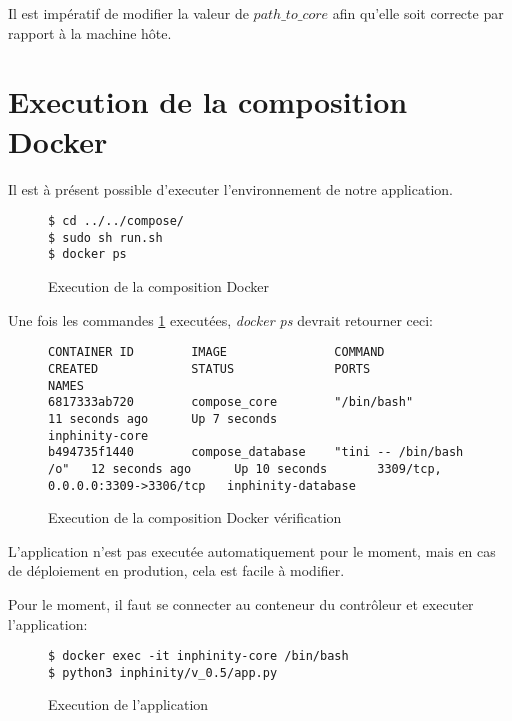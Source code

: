Il est impératif de modifier la valeur de \emph{$path\_to\_core$} afin qu’elle soit correcte par rapport à la machine hôte.

\newpage
\section{Execution de la composition Docker}

Il est à présent possible d'executer l'environnement de notre application.

\begin{figure}[H] 
\centering 
\begin{lstlisting}[frame=single]
$ cd ../../compose/
$ sudo sh run.sh
$ docker ps
\end{lstlisting} 
\caption[Code - Execution composition]{Execution de la composition Docker}
\label{fig:execCompose} 
\end{figure}

Une fois les commandes \ref{fig:execCompose} executées, \emph{docker ps} devrait retourner ceci:

\begin{figure}[H] 
\centering 
\begin{lstlisting}[frame=single]
CONTAINER ID        IMAGE               COMMAND                  CREATED             STATUS              PORTS                              NAMES
6817333ab720        compose_core        "/bin/bash"              11 seconds ago      Up 7 seconds                                           inphinity-core
b494735f1440        compose_database    "tini -- /bin/bash /o"   12 seconds ago      Up 10 seconds       3309/tcp, 0.0.0.0:3309->3306/tcp   inphinity-database
\end{lstlisting} 
\caption[Code - Execution composition vérification]{Execution de la composition Docker vérification}
\label{fig:execComposeCheck} 
\end{figure}

L'application n'est pas executée automatiquement pour le moment, mais en cas de déploiement en prodution, cela est facile à modifier.

Pour le moment, il faut se connecter au conteneur du contrôleur et executer l'application:

\begin{figure}[H] 
\centering 
\begin{lstlisting}[frame=single]
$ docker exec -it inphinity-core /bin/bash
$ python3 inphinity/v_0.5/app.py 
\end{lstlisting} 
\caption[Code - Execution Application]{Execution de l'application}
\label{fig:execComposeCheck} 
\end{figure}




















